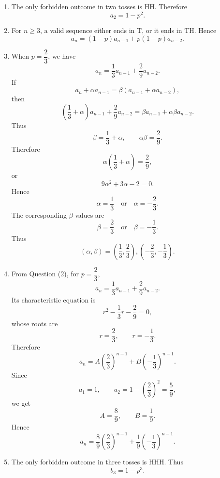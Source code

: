 \documentclass[10pt,a4paper]{article}
\begin{document}
\begin{enumerate}
  \item The only forbidden outcome in two tosses is HH. Therefore
        \[
          \boxed{a_2=1-p^2.}
        \]

  \item For $n\geq 3$, a valid sequence either ends in T, or it ends in TH. Hence
        \[
          \boxed{
          a_n=(1-p)a_{n-1}+p(1-p)a_{n-2}.}
        \]

  \item When $p=\dfrac23$, we have
        \[
          a_n=\frac13a_{n-1}+\frac29a_{n-2}.
        \]
        If
        \[
          a_n+\alpha a_{n-1}
          =
          \beta(a_{n-1}+\alpha a_{n-2}),
        \]
        then
        \[
          \left(\frac13+\alpha\right)a_{n-1}
          +\frac29a_{n-2}
          =
          \beta a_{n-1}+\alpha\beta a_{n-2}.
        \]
        Thus
        \[
          \beta=\frac13+\alpha,
          \qquad
          \alpha\beta=\frac29.
        \]
        Therefore
        \[
          \alpha\left(\frac13+\alpha\right)=\frac29,
        \]
        or
        \[
          9\alpha^2+3\alpha-2=0.
        \]
        Hence
        \[
          \alpha=\frac13
          \quad\text{or}\quad
          \alpha=-\frac23.
        \]
        The corresponding $\beta$ values are
        \[
          \beta=\frac23
          \quad\text{or}\quad
          \beta=-\frac13.
        \]
        Thus
        \[
          \boxed{
          (\alpha,\beta)=
          \left(\frac13,\frac23\right),
          \left(-\frac23,-\frac13\right).}
        \]

  \item From Question (2), for $p=\dfrac23$,
        \[
          a_n=\frac13a_{n-1}+\frac29a_{n-2}.
        \]
        Its characteristic equation is
        \[
          r^2-\frac13r-\frac29=0,
        \]
        whose roots are
        \[
          r=\frac23,\qquad r=-\frac13.
        \]
        Therefore
        \[
          a_n=A\left(\frac23\right)^{n-1}
          +B\left(-\frac13\right)^{n-1}.
        \]
        Since
        \[
          a_1=1,
          \qquad
          a_2=1-\left(\frac23\right)^2=\frac59,
        \]
        we get
        \[
          A=\frac89,
          \qquad
          B=\frac19.
        \]
        Hence
        \[
          \boxed{
          a_n=
          \frac89\left(\frac23\right)^{n-1}
          +\frac19\left(-\frac13\right)^{n-1}.}
        \]

  \item The only forbidden outcome in three tosses is HHH. Thus
        \[
          \boxed{b_3=1-p^3.}
        \]


\end{enumerate}
\end{document}
